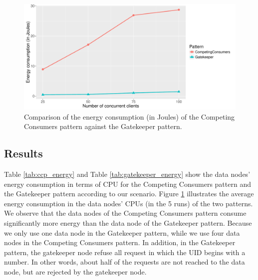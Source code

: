 \documentclass{article}
\begin{document}
\begin{figure}[t]
    \centering
        \includegraphics[width = \columnwidth]{images/energy.pdf}
    \caption{Comparison of the energy consumption (in Joules) of the Competing Consumers pattern against the Gatekeeper pattern.}
    \label{fig:energy}
\end{figure}


\subsection{Results}
Table \ref{tab:ccp_energy} and Table \ref{tab:gatekeeper_energy} show the data nodes' energy consumption in terms of CPU for the Competing Consumers pattern and the Gatekeeper pattern according to our scenario. Figure \ref{fig:energy} illustrates the average energy consumption in the data nodes' CPUs (in the 5 runs) of the two patterns.\\

We observe that the data nodes of the Competing Consumers pattern consume significantly more energy than the data node of the Gatekeeper pattern. Because we only use one data node in the Gatekeeper pattern, while we use four data nodes in the Competing Consumers pattern. In addition, in the Gatekeeper pattern, the gatekeeper node refuse all request in which the UID begins with a number. In other words, about half of the requests are not reached to the data node, but are rejected by the gatekeeper node.
\end{document}
